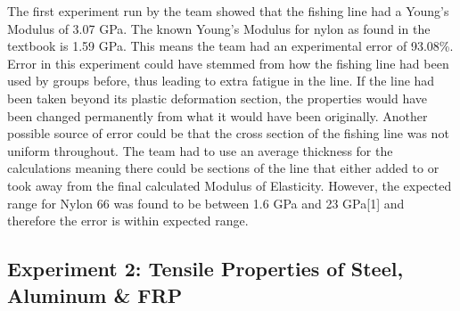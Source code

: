 \documentclass{article}
\begin{document}
The first experiment run by the team showed that the fishing line had a Young’s Modulus of 3.07 GPa. The known Young’s Modulus for nylon as found in the textbook is 1.59 GPa. This means the team had an experimental error of 93.08\%. Error in this experiment could have stemmed from how the fishing line had been used by groups before, thus leading to extra fatigue in the line. If the line had been taken beyond its plastic deformation section, the properties would have been changed permanently from what it would have been originally. Another possible source of error could be that the cross section of the fishing line was not uniform throughout. The team had to use an average thickness for the calculations meaning there could be sections of the line that either added to or took away from the final calculated Modulus of Elasticity. However, the expected range for Nylon 66 was found to be between 1.6 GPa and 23 GPa[1] and therefore the error is within expected range.

\subsection{Experiment 2: Tensile Properties of Steel, Aluminum \& FRP}
\end{document}
